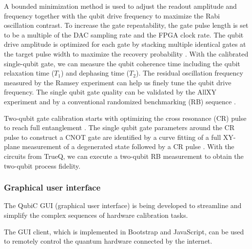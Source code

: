 \documentclass{ieeetran}
\begin{document}
A bounded minimization method \cite{brent2013algorithms} is used to adjust the readout amplitude and frequency together with the qubit drive frequency to maximize the Rabi oscillation contrast. 
To increase the gate repeatability, the gate pulse length is set to be a multiple of the DAC sampling rate and the FPGA clock rate. 
The qubit drive amplitude is optimized for each gate by stacking multiple identical gates at the target pulse width to maximize the recovery probability \cite{sheldon2016characterizing,xu2020automatic}.
With the calibrated single-qubit gate, we can measure the qubit coherence time including the qubit relaxation time ($T_1$) and dephasing time ($T_2$).
The residual oscillation frequency measured by the Ramsey experiment can help us finely tune the qubit drive frequency.
The single qubit gate quality can be validated by the AllXY experiment \cite{reed2013entanglement} and by a conventional randomized benchmarking (RB) sequence \cite{knill2008randomized}. 

Two-qubit gate calibration starts with optimizing the cross resonance (CR) pulse to reach full entanglement \cite{sheldon2016procedure}.
The single qubit gate parameters around the CR pulse to construct a CNOT gate are identified by a curve fitting of a full XY-plane measurement of a degenerated state followed by a CR pulse \cite{xu2021automatic}. 
With the circuits from TrueQ, we can execute a two-qubit RB measurement to obtain the two-qubit process fidelity.

\subsubsection{Graphical user interface}
The QubiC GUI (graphical user interface) is being developed to streamline and simplify the complex sequences of hardware calibration tasks.

The GUI client, which is implemented in Bootstrap and JavaScript,  can be used to remotely control the quantum hardware connected by the internet.
\end{document}
